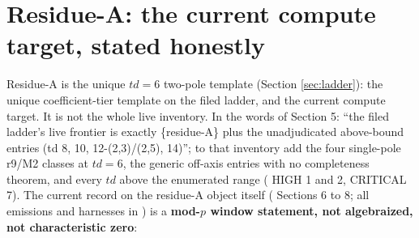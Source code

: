 \documentclass[11pt]{article}
\theoremstyle{definition}
\theoremstyle{remark}
\begin{document}
\section{Residue-A: the current compute target, stated honestly}\label{sec:residueA}

Residue-A is the unique $td=6$ two-pole template (Section
\ref{sec:ladder}): the unique coefficient-tier template on the filed
ladder, and the current compute target. It is not the whole live
inventory. In the words of  Section 5: ``the filed
ladder's live frontier is exactly \{residue-A\} plus the unadjudicated
above-bound entries (td 8, 10, 12-(2,3)/(2,5), 14)''; to that inventory
add the four single-pole r9/M2 classes at $td=6$, the generic off-axis
entries with no completeness theorem, and every $td$ above the enumerated
range ( HIGH 1 and 2, CRITICAL 7). The current record on
the residue-A object itself
( Sections 6 to 8; all emissions and harnesses in
) is a \textbf{mod-$p$ window statement, not algebraized, not
characteristic zero}:
\end{document}
